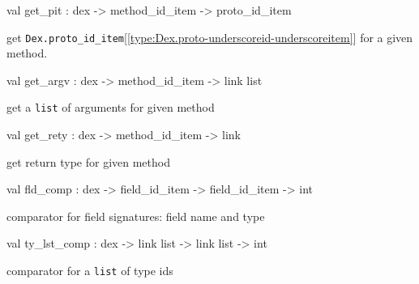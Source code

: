 \documentclass[11pt]{article}
\begin{document}
\label{val:Dex.get-underscorepit}\begin{ocamldoccode}
val get_pit : dex -> method_id_item -> proto_id_item
\end{ocamldoccode}
\begin{ocamldocdescription}
get {\tt{Dex.proto\_id\_item}}[\ref{type:Dex.proto-underscoreid-underscoreitem}] for a given method.


\end{ocamldocdescription}




\label{val:Dex.get-underscoreargv}\begin{ocamldoccode}
val get_argv : dex -> method_id_item -> link list
\end{ocamldoccode}
\begin{ocamldocdescription}
get a {\tt{list}} of arguments for given method


\end{ocamldocdescription}




\label{val:Dex.get-underscorerety}\begin{ocamldoccode}
val get_rety : dex -> method_id_item -> link
\end{ocamldoccode}
\begin{ocamldocdescription}
get return type for given method


\end{ocamldocdescription}




\label{val:Dex.fld-underscorecomp}\begin{ocamldoccode}
val fld_comp : dex -> field_id_item -> field_id_item -> int
\end{ocamldoccode}
\begin{ocamldocdescription}
comparator for field signatures: field name and type


\end{ocamldocdescription}




\label{val:Dex.ty-underscorelst-underscorecomp}\begin{ocamldoccode}
val ty_lst_comp : dex -> link list -> link list -> int
\end{ocamldoccode}
\begin{ocamldocdescription}
comparator for a {\tt{list}} of type ids


\end{ocamldocdescription}
\end{document}
